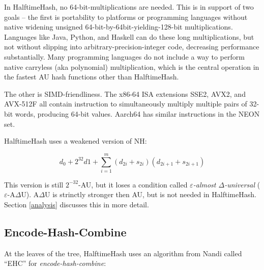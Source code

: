 \documentclass[sigconf, nonacm]{acmart}
\begin{document}
In HalftimeHash, no 64-bit-mul\-ti\-pli\-ca\-tions are needed.
This is in support of two goals --
the first is portability to platforms or programming languages without native widening unsigned 64-bit-by-64bit-yielding-128-bit multiplications.
Languages like Java, Python, and Haskell can do these long multiplications, but not without slipping into arbitrary-precision-integer code, decreasing performance substantially.
Many programming languages do not include a way to perform native carryless (aka polynomial) multiplication, which is the central operation in the fastest AU hash functions other than HalftimeHash. \cite{umash,clhash}


The other is SIMD-friendliness.
The x86-64 ISA extensions SSE2, AVX2, and AVX-512F all contain instruction to simultaneously multiply multiple pairs of 32-bit words, producing 64-bit values.
Aarch64 has similar instructions in the NEON set.



HalftimeHash uses a weakened version of NH:

\[
d_0 + 2^{32} d1 + \sum_{i=1}^m (d_{2i} + s_{2i})(d_{2i+1} + s_{2i+1})
\]

This version is still $2^{-32}$-AU, but it loses a condition called {\em$ \varepsilon$-almost $\Delta$-universal} ($\varepsilon$-A$\Delta$U).
A$\Delta$U is strinctly stronger then AU, but is not needed in HalftimeHash.
Section \ref{analysis} discusses this in more detail.



\subsection{Encode-Hash-Combine}

At the leaves of the tree, HalftimeHash uses an algorithm from Nandi called ``EHC'' for {\em encode-hash-combine}: \cite{ehc-nandi}
\end{document}
